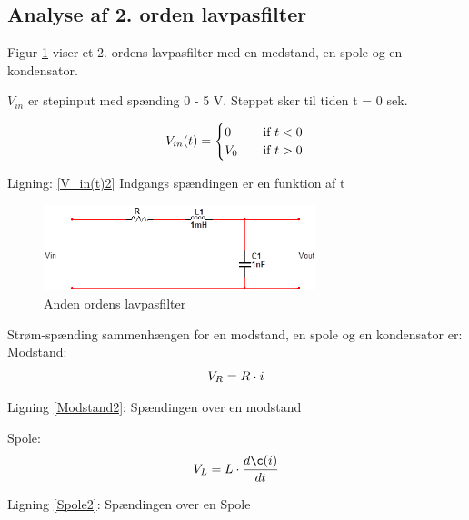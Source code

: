 \subsection{Analyse af 2. orden lavpasfilter}

Figur \ref{2orden_ana} viser et 2. ordens lavpasfilter med en medstand, en spole og en kondensator.

$V_{in}$ er stepinput med spænding 0 - 5 V. Steppet sker til tiden t = 0 sek.

\begin{equation}
 V_{in}(t) =
  \begin{cases}
    0 & \quad \text{if } t <0\\
    V_{0}&\quad \text{if } t >0\\
  \end{cases}
  \label{V_in(t)2}\\
\end{equation}
\begin{center}

Ligning: \ref{V_in(t)2} Indgangs spændingen er en funktion af t
\end{center}

\begin{figure}[h]
 \begin{center}
  \includegraphics[height=2.5cm]{P_Fig/figur13_ana2}
  \caption{Anden ordens lavpasfilter}
  \label{2orden_ana}
 \end{center}
\end{figure}

\newpage

Strøm-spænding sammenhængen for en modstand, en spole og en kondensator er: \\

Modstand:
\begin{equation}
 V_{R} =R\cdot i
\label{Modstand2}\\
\end{equation}
\begin{center}
Ligning \ref{Modstand2}: Spændingen over en modstand
\end{center}

Spole:
\begin{equation}
	V_{L} = L\cdot \dfrac{d \c(i)}{dt}
\label{Spole2}\\
\end{equation}
\begin{center}
Ligning \ref{Spole2}: Spændingen over en Spole
\end{center}


